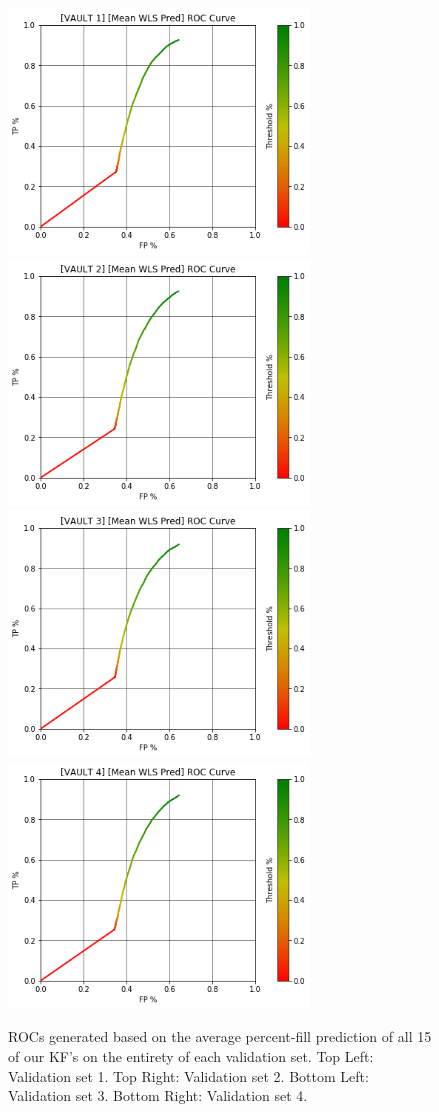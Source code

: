 \begin{figure}[h]
\centering
\includegraphics[width=8cm]{body/results/Graphs/JustSeries/1.PerformaceofMean/2.WLS/Raw/v1.png}
\includegraphics[width=8cm]{body/results/Graphs/JustSeries/1.PerformaceofMean/2.WLS/Raw/v2.png}
\includegraphics[width=8cm]{body/results/Graphs/JustSeries/1.PerformaceofMean/2.WLS/Raw/v3.png}
\includegraphics[width=8cm]{body/results/Graphs/JustSeries/1.PerformaceofMean/2.WLS/Raw/v4.png}
\caption{ROCs generated based on the average percent-fill prediction of all 15 of our KF's on the entirety of each validation set. Top Left: Validation set 1. Top Right: Validation set 2. Bottom Left: Validation set 3. Bottom Right: Validation set 4.}
\label{fig:averageWLS0}
\end{figure}

